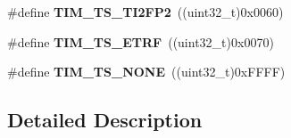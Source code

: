 \begin{DoxyCompactItemize}
\item 
\hypertarget{group___t_i_m___trigger___selection_ga0ed58a269bccd3f22d19cc9a2ba3123f}{\#define {\bfseries T\-I\-M\-\_\-\-T\-S\-\_\-\-T\-I2\-F\-P2}~((uint32\-\_\-t)0x0060)}\label{group___t_i_m___trigger___selection_ga0ed58a269bccd3f22d19cc9a2ba3123f}

\item 
\hypertarget{group___t_i_m___trigger___selection_gaece08e02e056613a882aa7ff0a6ccc2d}{\#define {\bfseries T\-I\-M\-\_\-\-T\-S\-\_\-\-E\-T\-R\-F}~((uint32\-\_\-t)0x0070)}\label{group___t_i_m___trigger___selection_gaece08e02e056613a882aa7ff0a6ccc2d}

\item 
\hypertarget{group___t_i_m___trigger___selection_ga257bee9dc9f2f71a73124dd8c2329480}{\#define {\bfseries T\-I\-M\-\_\-\-T\-S\-\_\-\-N\-O\-N\-E}~((uint32\-\_\-t)0x\-F\-F\-F\-F)}\label{group___t_i_m___trigger___selection_ga257bee9dc9f2f71a73124dd8c2329480}

\end{DoxyCompactItemize}


\subsection{Detailed Description}
